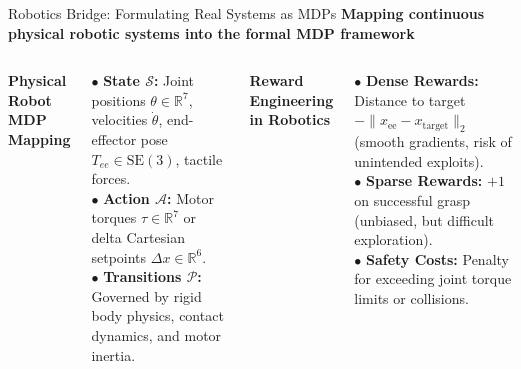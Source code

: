 \documentclass[aspectratio=169,10pt]{beamer}
\newcommand{\sectionlabel}[1]{%
  {\small\bfseries\color{islteal}#1}\par\vspace{0.14cm}%
}
\begin{document}
\begin{frame}{Robotics Bridge: Formulating Real Systems as MDPs}
  \sectionlabel{Mapping continuous physical robotic systems into the formal MDP framework}

  \begin{columns}[T,onlytextwidth]
      {\small\bfseries\color{islnavy} Physical Robot MDP Mapping}\par\vspace{0.08cm}
      {\footnotesize
      $\bullet$ \textbf{State $\mathcal{S}$:} Joint positions $\theta \in \mathbb{R}^7$, velocities $\dot{\theta}$, end-effector pose $T_{ee} \in \text{SE}(3)$, tactile forces.\\[2pt]
      $\bullet$ \textbf{Action $\mathcal{A}$:} Motor torques $\tau \in \mathbb{R}^7$ or delta Cartesian setpoints $\Delta x \in \mathbb{R}^6$.\\[2pt]
      $\bullet$ \textbf{Transitions $\mathcal{P}$:} Governed by rigid body physics, contact dynamics, and motor inertia.}

      {\small\bfseries\color{islteal} Reward Engineering in Robotics}\par\vspace{0.08cm}
      {\footnotesize
      $\bullet$ \textbf{Dense Rewards:} Distance to target $-\|x_{\text{ee}} - x_{\text{target}}\|_2$ (smooth gradients, risk of unintended exploits).\\[2pt]
      $\bullet$ \textbf{Sparse Rewards:} $+1$ on successful grasp (unbiased, but difficult exploration).\\[2pt]
      $\bullet$ \textbf{Safety Costs:} Penalty for exceeding joint torque limits or collisions.}
  \end{columns}
\end{frame}
\end{document}
